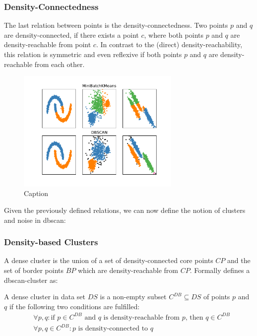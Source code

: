 \subsubsection*{Density-Connectedness}
The last relation between points is the density-connectedness. Two points $p$ and $q$ are density-connected, if there exists a point $c$, where both points $p$ and $q$ are density-reachable from point $c$. In contrast to the (direct) density-reachability, this relation is symmetric and even reflexive if both points $p$ and $q$ are density-reachable from each other. 
\begin{figure}
    \centering
    \includegraphics[width=0.7\textwidth]{figures/KMeansVSDBSCAN.pdf}
    \caption{Caption}
    \label{fig:kmeansdbscan}
\end{figure}

\vspace{5mm}

Given the previously defined relations, we can now define the notion of clusters and noise in \gls{dbscan}:

\subsubsection*{Density-based Clusters}
A dense cluster is the union of a set of density-connected core points $CP$ and the set of border points $BP$ which are density-reachable from $CP$.
Formally \citeauthor{DBSCANEKSX96} defines a \gls{dbscan}-cluster as:

A dense cluster in data set $DS$ is a non-empty subset $C^{DB} \subseteq DS$ of points $p$ and $q$ if the following two conditions are fulfilled:
\begin{align}
    &\forall p, q: \text{if } p \in C^{DB} \text{ and } q \text{ is density-reachable from } p \text{, then } q \in C^{DB} \\
    &\forall p, q \in C^{DB}: p \text{ is density-connected to }q
\end{align}


